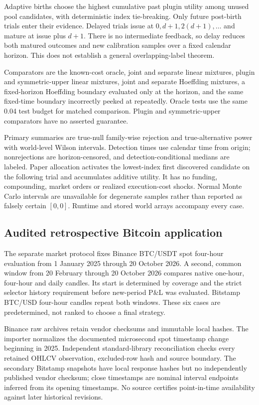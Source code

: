 Adaptive births choose the highest cumulative past plugin utility among unused
pool candidates, with deterministic index tie-breaking. Only future post-birth
trials enter their evidence. Delayed trials issue at $0,d+1,2(d+1),\ldots$ and
mature at issue plus $d+1$. There is no intermediate feedback, so delay reduces
both matured outcomes and new calibration samples over a fixed calendar
horizon. This does not establish a general overlapping-label theorem.

Comparators are the known-cost oracle, joint and separate linear mixtures,
plugin and symmetric-upper linear mixtures, joint and separate Hoeffding
mixtures, a fixed-horizon Hoeffding boundary evaluated only at the horizon, and
the same fixed-time boundary incorrectly peeked at repeatedly. Oracle tests use
the same 0.04 test budget for matched comparison. Plugin and symmetric-upper
comparators have no asserted guarantee.

Primary summaries are true-null family-wise rejection and true-alternative
power with world-level Wilson intervals. Detection times use calendar time from
origin; nonrejections are horizon-censored, and detection-conditional medians
are labeled. Paper allocation activates the lowest-index first discovered
candidate on the following trial and accumulates additive utility. It has no
funding, compounding, market orders or realized execution-cost shocks. Normal
Monte Carlo intervals are unavailable for degenerate samples rather than
reported as falsely certain $[0,0]$. Runtime and stored world arrays accompany
every case.



\subsection{Audited retrospective Bitcoin application}

The separate market protocol fixes Binance BTC/USDT spot four-hour evaluation
from 1 January 2025 through 20 October 2026. A second, common window from
20 February through 20 October 2026 compares native one-hour, four-hour and
daily candles. Its start is determined by coverage and the strict selector
history requirement before new-period P\&L was evaluated. Bitstamp BTC/USD
four-hour candles repeat both windows. These six cases are predetermined, not
ranked to choose a final strategy.

Binance raw archives retain vendor checksums and immutable local hashes. The
importer normalizes the documented microsecond spot timestamp change beginning
in 2025. Independent standard-library reconciliation checks every retained
OHLCV observation, excluded-row hash and source boundary. The secondary
Bitstamp snapshots have local response hashes but no independently published
vendor checksum; close timestamps are nominal interval endpoints inferred from
its opening timestamps. No source certifies point-in-time availability against
later historical revisions.

